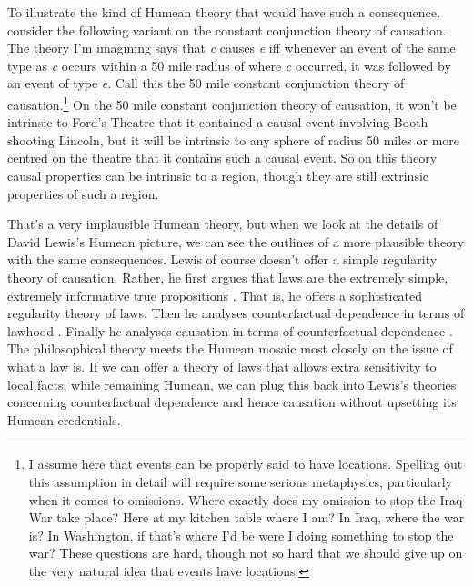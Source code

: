 To illustrate the kind of Humean theory that would have such a consequence, consider the following variant on the constant conjunction theory of causation. The theory I'm imagining says that \textit{c} causes \textit{e} iff whenever an event of the same type as \textit{c} occurs within a 50 mile radius of where \textit{c} occurred, it was followed by an event of type \textit{e}. Call this the 50 mile constant conjunction theory of causation.\footnote{I assume here that events can be properly said to have locations. Spelling out this assumption in detail will require some serious metaphysics, particularly when it comes to omissions. Where exactly does my omission to stop the Iraq War take place? Here at my kitchen table where I am? In Iraq, where the war is? In Washington, if that's where I'd be were I doing something to stop the war? These questions are hard, though not so hard that we should give up on the very natural idea that events have locations.} On the 50 mile constant conjunction theory of causation, it won't be intrinsic to Ford's Theatre that it contained a causal event involving Booth shooting Lincoln, but it will be intrinsic to any sphere of radius 50 miles or more centred on the theatre that it contains such a causal event. So on this theory causal properties can be intrinsic to a region, though they are still extrinsic properties of such a region.

That's a very implausible Humean theory, but when we look at the details of David Lewis's Humean picture, we can see the outlines of a more plausible theory with the same consequences. Lewis of course doesn't offer a simple regularity theory of causation. Rather, he first argues that laws are the extremely simple, extremely informative true propositions \cite[73]{Lewis1973a}. That is, he offers a sophisticated regularity theory of laws. Then he analyses counterfactual dependence in terms of lawhood \citep{Lewis1973a, Lewis1979c}. Finally he analyses causation in terms of counterfactual dependence \citep{Lewis2004a}. The philosophical theory meets the Humean mosaic most closely on the issue of what a law is. If we can offer a theory of laws that allows extra sensitivity to local facts, while remaining Humean, we can plug this back into Lewis's theories concerning counterfactual dependence and hence causation without upsetting its Humean credentials.

